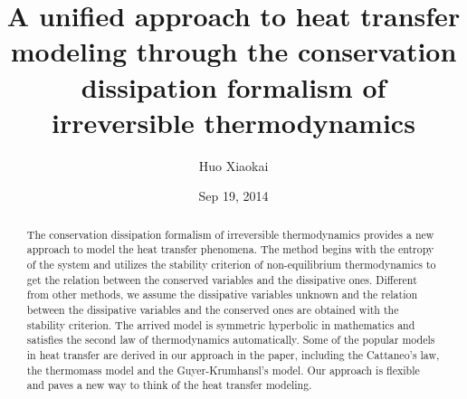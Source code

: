 \documentclass[a4paper]{article}
\title{A unified approach to heat transfer modeling through the conservation dissipation formalism of irreversible thermodynamics}
\author{Huo Xiaokai}
\date{Sep 19, 2014}
\begin{document}
\maketitle

\begin{abstract}
The conservation dissipation formalism of irreversible thermodynamics provides a new approach to model the heat transfer phenomena. The method begins with the entropy of the system and utilizes the stability criterion of non-equilibrium thermodynamics to get the relation between the conserved variables and the dissipative ones. Different from other methods, we assume the dissipative variables unknown and the relation between the dissipative variables and the conserved ones are obtained with the stability criterion. The arrived model is symmetric hyperbolic in mathematics and satisfies the second law of thermodynamics automatically. Some of the popular models in heat transfer are derived in our approach in the paper, including the Cattaneo's law, the thermomass model and the Guyer-Krumhansl's model. Our approach is flexible and paves a new way to think of the heat transfer modeling. 
\end{abstract}
\end{document}
